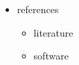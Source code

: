 \documentclass[a0paper]{betterposter}
\begin{document}
{\begin{itemize}
  \begin{itemize}
  \tightlist
  \item
    mentors at NCAR
  \item
    visits from Philip and Kevin
  \end{itemize}
\item
  references

  \begin{itemize}
  \tightlist
  \item
    literature
  \item
    software
  \end{itemize}
\end{itemize}

} 
\end{document}
